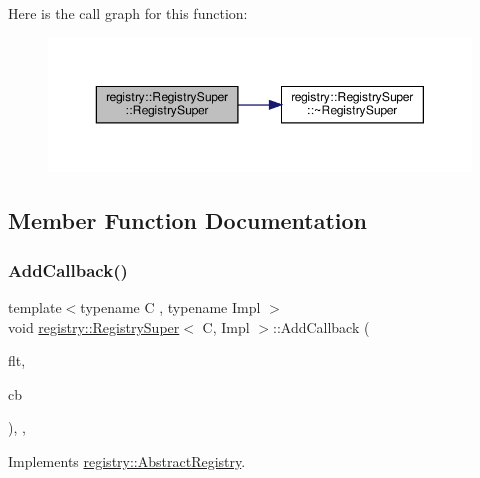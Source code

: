 Here is the call graph for this function\+:
\nopagebreak
\begin{figure}[H]
\begin{center}
\leavevmode
\includegraphics[width=350pt]{classregistry_1_1RegistrySuper_a91a93b354ebf303d24b0821a252c1ccf_cgraph}
\end{center}
\end{figure}


\subsection{Member Function Documentation}
\mbox{\label{classregistry_1_1RegistrySuper_a80e234502449509e0c9ce75e787ef974}} 
\subsubsection{\texorpdfstring{Add\+Callback()}{AddCallback()}}
{\footnotesize\ttfamily template$<$typename C , typename Impl $>$ \\
void \hyperlink{classregistry_1_1RegistrySuper}{registry\+::\+Registry\+Super}$<$ C, Impl $>$\+::Add\+Callback (\begin{DoxyParamCaption}\item[{\hyperlink{classregistry_1_1Filter}{Filter}}]{flt,  }\item[{\hyperlink{classregistry_1_1AbstractRegistry_a08a798ca9ca1c4c983ebd2386ca3c315}{Abstract\+Registry\+::\+Callback}}]{cb }\end{DoxyParamCaption})\hspace{0.3cm}{\ttfamily [override]}, {\ttfamily [virtual]}, {\ttfamily [noexcept]}}



Implements \hyperlink{classregistry_1_1AbstractRegistry_a83f61ca483c22185ddf43653ca65a8ef}{registry\+::\+Abstract\+Registry}.

